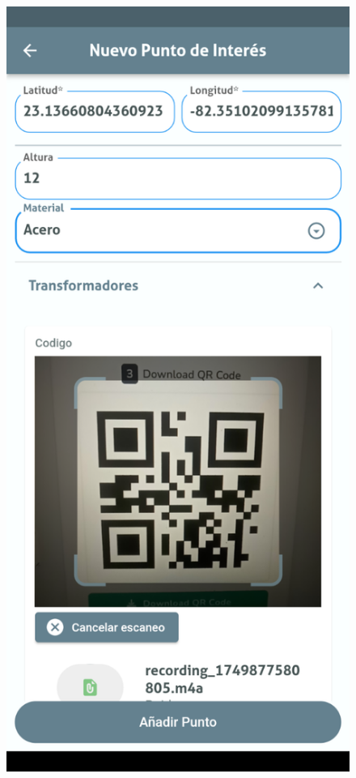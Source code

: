 \documentclass{article}
\begin{document}
\begin{figure}[H]
  \centering
  \begin{minipage}[b]{0.3\textwidth}
    \centering
    \includegraphics[width=\textwidth]{images/functionality_test/medias2.png}

\end{minipage}
\end{figure}
\end{document}
